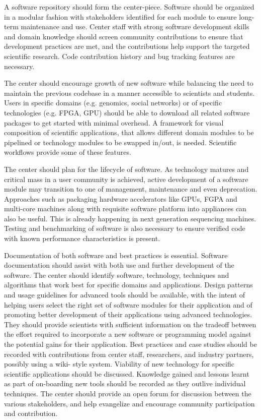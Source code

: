 A software repository should form the center-piece. Software should be organized in a modular fashion with stakeholders identified for each module to ensure long-term maintenance and use. Center staff with strong software development skills and domain knowledge should screen community contributions to ensure that development practices are met, and the contributions help support the targeted scientific research. Code contribution history and bug tracking features are necessary.

The center should encourage growth of new software while balancing the need to maintain the previous codebase in a manner accessible to scientists and students. Users in specific domains (e.g. genomics, social networks) or of specific technologies (e.g. FPGA, GPU) should be able to download all related software packages to get started with minimal overhead. A framework for visual composition of scientific applications, that allows different domain modules to be pipelined or technology modules to be swapped in/out, is needed. Scientific workflows provide some of these features.

The center should plan for the lifecycle of software. As technology matures and critical mass in a user community is achieved, active development of a software module may transition to one of management, maintenance and even deprecation. Approaches such as packaging hardware accelerators like GPUs, FGPA and multi-core machines along with requisite software platform into appliances can also be useful. This is already happening in next generation sequencing machines. Testing and benchmarking of software is also necessary to ensure verified code with known performance characteristics is present.

Documentation of both software and best practices is essential. Software documentation should assist with both use and further development of the software. The center should identify software,
technology, techniques and algorithms that work best for specific domains and applications. Design patterns and usage guidelines for advanced tools should be available, with the intent of helping users select the right set of software modules for their application and of promoting better development of their applications using advanced technologies. They should provide scientists with sufficient information on the tradeoff between the effort required to incorporate a new software or programming model against the potential gains for their application. Best practices and case studies should be recorded with contributions from center staff, researchers, and industry partners, possibly using a wiki- style system. Viability of new technology for specific scientific applications should be discussed. Knowledge gained and lessons learnt as part of on-boarding new tools should be recorded as they outlive individual techniques. The center should provide an open forum for discussion between the various stakeholders, and help evangelize and encourage community participation and contribution.

